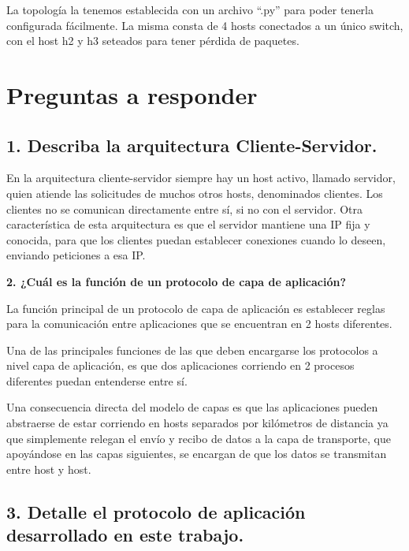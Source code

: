 \documentclass{article}
\begin{document}
La topología la tenemos establecida con un archivo ``.py'' para poder tenerla configurada fácilmente. La misma consta de 4 hosts conectados a un único switch, con el host h2 y h3 seteados para tener pérdida de
paquetes.

\section{\texorpdfstring{\textbf{Preguntas a responder}}{Preguntas a responder}}\label{preguntas-a-responder}

\subsection{\texorpdfstring{\textbf{1. Describa la arquitectura Cliente-Servidor.}}{1. Describa la arquitectura Cliente-Servidor.}}\label{describa-la-arquitectura-cliente-servidor.}

En la arquitectura cliente-servidor siempre hay un host activo, llamado servidor, quien atiende las solicitudes de muchos otros hosts, denominados clientes. Los clientes no se comunican directamente entre sí, si no con el servidor. Otra característica de esta arquitectura es que el servidor mantiene una IP fija y conocida, para que los clientes puedan establecer conexiones cuando lo deseen, enviando peticiones a esa IP.

\textbf{2. ¿Cuál es la función de un protocolo de capa de aplicación?}

La función principal de un protocolo de capa de aplicación es establecer reglas para la comunicación entre aplicaciones que se encuentran en 2 hosts diferentes.

Una de las principales funciones de las que deben encargarse los protocolos a nivel capa de aplicación, es que dos aplicaciones corriendo en 2 procesos diferentes puedan entenderse entre sí.

Una consecuencia directa del modelo de capas es que las aplicaciones pueden abstraerse de estar corriendo en hosts separados por kilómetros de distancia ya que simplemente relegan el envío y recibo de datos a la capa de transporte, que apoyándose en las capas siguientes, se encargan de que los datos se transmitan entre host y host.

\subsection{\texorpdfstring{\textbf{3. Detalle el protocolo de aplicación desarrollado en este trabajo.}}{3. Detalle el protocolo de aplicación desarrollado en este trabajo.}}\label{detalle-el-protocolo-de-aplicaciuxf3n-desarrollado-en-este-trabajo.}
\end{document}
